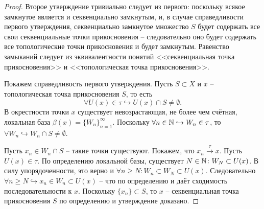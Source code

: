 \begin{proof}
    Второе утверждение тривиально следует из первого: поскольку всякое замкнутое является и секвенциально замкнутым, и, в случае справедливости первого утверждения, секвенциально замкнутое множество $S$ будет содержать все свои секвенциальные точки прикосновения -- следовательно оно будет содержать все топологические точки прикосновения и будет замкнутым.
    Равенство замыканий следует из эквивалентности понятий <<секвенциальная точка прикосновения>> и <<топологическая точка прикосновения>>.

    Покажем справедливость первого утверждения.
    Пусть $S \subset X$ и $x$ -- топологическая точка прикосновения $S$, то есть
    \[
        \forall U(x) \in \tau \hookrightarrow U(x) \cap S \neq \emptyset.
    \]
    В окрестности точки $x$ существует невозрастающая, не более чем счётная, локальная база $\beta(x) = \{W_n\}_{n = 1}^{\infty}$.
    Поскольку $\forall n \in \mathbb{N} \hookrightarrow W_n \in \tau$, то $\forall W_n \hookrightarrow W_n \cap S \neq \emptyset$.

    Пусть $x_n \in W_n \cap S$ -- такие точки существуют.
    Покажем, что $x_n \xrightarrow{\tau} x$.
    Пусть $U(x) \in \tau$.
    По определению локальной базы, существует $N \in \mathbb{N}\colon W_N \subset U(x)$.
    В силу упорядоченности, это верно и $\forall n \geq N\colon W_n \subset W_N \subset U(x)$.
    Следовательно $\forall n \geq N \hookrightarrow x_n \in W_n \subset U(x)$ -- что по определению и даёт сходимость последовательности к $x$.
    Поскольку $\{x_n\} \subset S$, то $x$ -- секвенциальная точка прикосновения $S$ по определению и утверждение доказано.
\end{proof}
